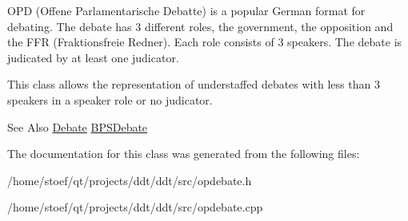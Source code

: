 O\-P\-D (Offene Parlamentarische Debatte) is a popular German format for debating. The debate has 3 different roles, the government, the opposition and the F\-F\-R (Fraktionsfreie Redner). Each role consists of 3 speakers. The debate is judicated by at least one judicator.

This class allows the representation of understaffed debates with less than 3 speakers in a speaker role or no judicator. \begin{DoxySeeAlso}{See Also}
\hyperlink{classDebate}{Debate} \hyperlink{classBPSDebate}{B\-P\-S\-Debate} 
\end{DoxySeeAlso}


The documentation for this class was generated from the following files\-:\begin{DoxyCompactItemize}
\item 
/home/stoef/qt/projects/ddt/ddt/src/opdebate.\-h\item 
/home/stoef/qt/projects/ddt/ddt/src/opdebate.\-cpp\end{DoxyCompactItemize}
